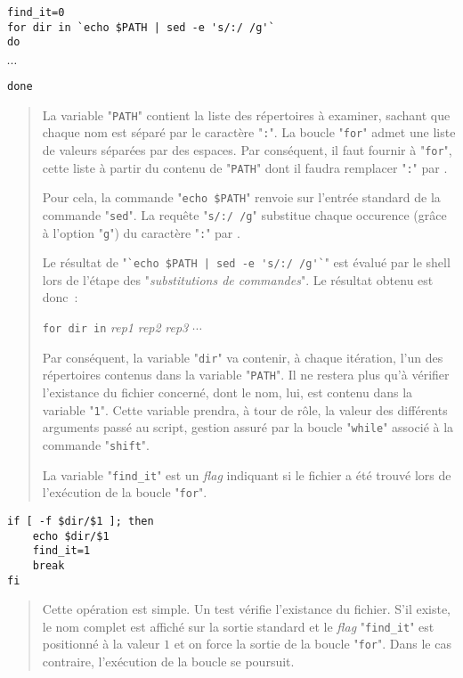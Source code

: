 \begin{verbatim}
find_it=0
for dir in `echo $PATH | sed -e 's/:/ /g'`
do
\end{verbatim}
\vspace{2ex}
$\cdots$
\\[2ex]
\begin{verbatim}
done
\end{verbatim}
\begin{quote}
La variable "{\tt PATH}" contient la liste des r{\'e}pertoires {\`a} examiner, sachant que
chaque nom est s{\'e}par{\'e} par le caract{\`e}re "{\tt :}". La boucle "{\tt for}"
admet une liste de valeurs s{\'e}par{\'e}es par des espaces. Par cons{\'e}quent, il faut fournir
{\`a} "{\tt for}", cette liste {\`a} partir du contenu de "{\tt PATH}" dont il faudra
remplacer "{\tt :}" par \spacekey.

Pour cela, la commande "\verb,echo $PATH," renvoie sur l'entr{\'e}e standard de la
commande "{\tt sed}". La requ{\^e}te "\verb*,s/:/ /g," substitue chaque
occurence (gr{\^a}ce {\`a} l'option "{\tt g}") du caract{\`e}re "{\tt :}" par
\spacekey.

Le r{\'e}sultat de "\verb*,`echo $PATH | sed -e 's/:/ /g'`," est {\'e}valu{\'e} par le
shell lors de l'{\'e}tape des "{\sl substitutions de commandes}". Le r{\'e}sultat obtenu
est donc~:
\begin{center}
\verb,for dir in, {\sl rep1} {\sl rep2} {\sl rep3} $\cdots$
\end{center}
Par cons{\'e}quent, la variable "{\tt dir}" va contenir, {\`a} chaque it{\'e}ration, l'un
des r{\'e}pertoires contenus dans la variable "{\tt PATH}". Il ne restera plus qu'{\`a}
v{\'e}rifier l'existance du fichier concern{\'e}, dont le nom, lui, est contenu dans la variable
"{\tt 1}". Cette variable prendra, {\`a} tour de r{\^o}le, la valeur des diff{\'e}rents
arguments pass{\'e} au script, gestion assur{\'e} par la boucle "{\tt while}" associ{\'e}
{\`a} la commande "{\tt shift}".

La variable "{\tt find\_it}" est un {\it flag} indiquant si le fichier a {\'e}t{\'e} trouv{\'e}
lors de l'ex{\'e}cution de la boucle "{\tt for}".
\end{quote}

\begin{verbatim}
if [ -f $dir/$1 ]; then
    echo $dir/$1
    find_it=1
    break
fi
\end{verbatim}
\begin{quote}
Cette op{\'e}ration est simple. Un test v{\'e}rifie l'existance du fichier. S'il existe, le nom complet
est affich{\'e} sur la sortie standard et le {\it flag} "{\tt find\_it}"
est positionn{\'e} {\`a} la valeur $1$ et on force la sortie de la boucle "{\tt for}". Dans le
cas contraire, l'ex{\'e}cution de la boucle se poursuit.
\end{quote}


